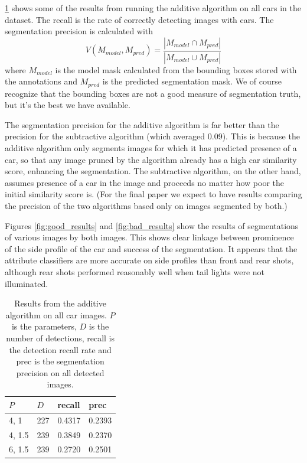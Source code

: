\documentclass[10pt,twocolumn,letterpaper]{article}
\begin{document}
\ref{table:aresults} shows some of the results from running the additive algorithm
on all cars in the dataset.  The recall is the rate of correctly detecting
images with cars.  The segmentation precision is calculated with
\[ V(M_{model},M_{pred}) = \frac{|M_{model} \cap M_{pred}|}{|M_{model} \cup M_{pred}|} \]
where $M_{model}$ is the model mask calculated from the bounding boxes
stored with the annotations and $M_{pred}$ is the predicted segmentation
mask.  We of course recognize that the bounding boxes are not a good measure
of segmentation truth, but it's the best we have available.

The segmentation precision for the additive algorithm
is far better than the precision for the subtractive algorithm (which averaged
0.09).  This is because the additive algorithm only segments images for
which it has predicted presence of a car, so that any image pruned by the
algorithm already has a high car similarity score, enhancing the segmentation.
The subtractive algorithm, on the other hand, assumes presence of a car in
the image and proceeds no matter how poor the initial similarity score is.
(For the final paper we expect to have results comparing the precision
of the two algorithms based only on images segmented by both.)

Figures \ref{fig:good_results} and \ref{fig:bad_results} show the results
of segmentations of various images by both images.  This shows clear linkage
between prominence of the side profile of the car and success of the segmentation.
It appears that the attribute classifiers are more accurate on side profiles
than front and rear shots, although rear shots performed reasonably well when
tail lights were not illuminated.

\begin{table}
\centering
\begin{tabular}{|l|l|l|l|}
\hline
$P$ & $D$ & recall & prec \\ \hline
4, 1 & 227 & 0.4317 & 0.2393 \\ \hline
4, 1.5 & 239 & 0.3849 & 0.2370 \\ \hline
6, 1.5 & 239 & 0.2720 & 0.2501 \\ \hline
\end{tabular}
\caption{Results from the additive algorithm on all car images.  $P$ is
the parameters, $D$ is the number of detections, recall is the detection
recall rate and prec is the segmentation precision on all detected
images.}
\label{table:aresults}
\end{table}
\end{document}
